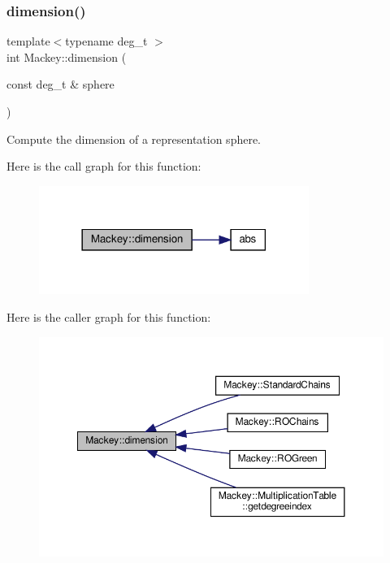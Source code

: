 \subsubsection{\texorpdfstring{dimension()}{dimension()}}
{\footnotesize\ttfamily template$<$typename deg\+\_\+t $>$ \\
int Mackey\+::dimension (\begin{DoxyParamCaption}\item[{const deg\+\_\+t \&}]{sphere }\end{DoxyParamCaption})\hspace{0.3cm}{\ttfamily [inline]}}



Compute the dimension of a representation sphere. 

Here is the call graph for this function\+:\nopagebreak
\begin{figure}[H]
\begin{center}
\leavevmode
\includegraphics[width=249pt]{namespaceMackey_a6a5d40e69e5628ea84896ee43f4a91fa_cgraph}
\end{center}
\end{figure}
Here is the caller graph for this function\+:\nopagebreak
\begin{figure}[H]
\begin{center}
\leavevmode
\includegraphics[width=350pt]{namespaceMackey_a6a5d40e69e5628ea84896ee43f4a91fa_icgraph}
\end{center}
\end{figure}
\mbox{\label{namespaceMackey_a281b9be315d7d51c7e691d4c733ac0c9}} 
